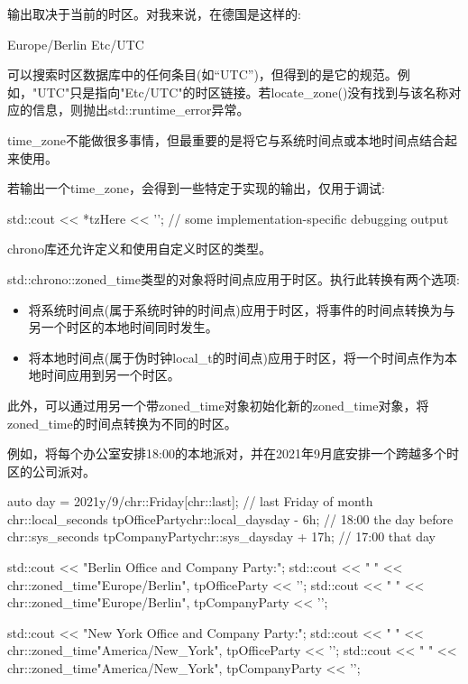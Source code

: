 输出取决于当前的时区。对我来说，在德国是这样的:

\begin{shell}
Europe/Berlin
Etc/UTC
\end{shell}

可以搜索时区数据库中的任何条目(如“UTC”)，但得到的是它的规范。例如，"UTC"只是指向"Etc/UTC"的时区链接。若locate\_zone()没有找到与该名称对应的信息，则抛出std::runtime\_error异常。

time\_zone不能做很多事情，但最重要的是将它与系统时间点或本地时间点结合起来使用。

若输出一个time\_zone，会得到一些特定于实现的输出，仅用于调试:

\begin{cpp}
std::cout << *tzHere << '\n'; // some implementation-specific debugging output
\end{cpp}

chrono库还允许定义和使用自定义时区的类型。


std::chrono::zoned\_time类型的对象将时间点应用于时区。执行此转换有两个选项:

\begin{itemize}
\item 
将系统时间点(属于系统时钟的时间点)应用于时区，将事件的时间点转换为与另一个时区的本地时间同时发生。

\item
将本地时间点(属于伪时钟local\_t的时间点)应用于时区，将一个时间点作为本地时间应用到另一个时区。
\end{itemize}

此外，可以通过用另一个带zoned\_time对象初始化新的zoned\_time对象，将zoned\_time的时间点转换为不同的时区。

例如，将每个办公室安排18:00的本地派对，并在2021年9月底安排一个跨越多个时区的公司派对。

\begin{cpp}
auto day = 2021y/9/chr::Friday[chr::last]; // last Friday of month
chr::local_seconds tpOfficeParty{chr::local_days{day} - 6h}; // 18:00 the day before
chr::sys_seconds tpCompanyParty{chr::sys_days{day} + 17h}; // 17:00 that day

std::cout << "Berlin Office and Company Party:\n";
std::cout << " " << chr::zoned_time{"Europe/Berlin", tpOfficeParty} << '\n';
std::cout << " " << chr::zoned_time{"Europe/Berlin", tpCompanyParty} << '\n';

std::cout << "New York Office and Company Party:\n";
std::cout << " " << chr::zoned_time{"America/New_York", tpOfficeParty} << '\n';
std::cout << " " << chr::zoned_time{"America/New_York", tpCompanyParty} << '\n';
\end{cpp}

